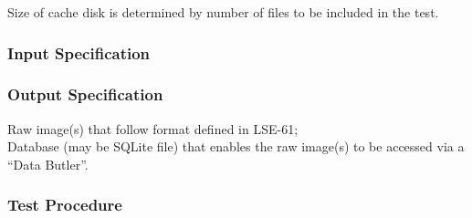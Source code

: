 Size of cache disk is determined by number of files to be included in
the test.


\subsubsection{Input Specification}

\subsubsection{Output Specification}
Raw image(s) that follow format defined in LSE-61;\\
Database (may be SQLite file) that enables the raw image(s) to be
accessed via a ``Data Butler''.


\subsubsection{Test Procedure}
